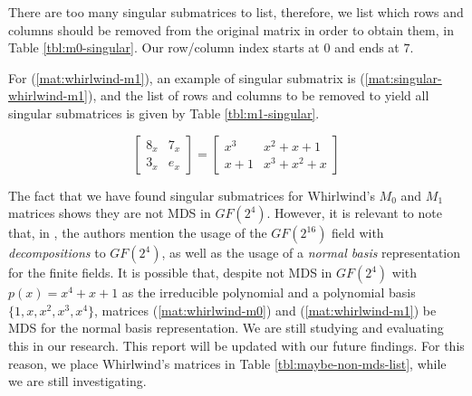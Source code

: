 There are too many singular submatrices to list, therefore, we list which rows and columns should be removed from the original matrix in order to obtain them, in Table \ref{tbl:m0-singular}. Our row/column index starts at $0$ and ends at $7$.



For (\ref{mat:whirlwind-m1}), an example of singular submatrix is (\ref{mat:singular-whirlwind-m1}), and the list of rows and columns to be removed to yield all singular submatrices is given by Table \ref{tbl:m1-singular}.

\begin{equation}\label{mat:singular-whirlwind-m1}
\begin{bmatrix}
8_x & 7_x\\
3_x & e_x
\end{bmatrix}
=
\begin{bmatrix}
x^3 & x^2 + x + 1\\
x + 1 & x^3 + x^2 + x
\end{bmatrix}
\end{equation}



The fact that we have found singular submatrices for Whirlwind's $M_0$ and $M_1$ matrices shows they are not MDS in $GF(2^4)$. However, it is relevant to note that, in \cite{Whirlwind2010}, the authors mention the usage of the $GF(2^{16})$ field with \emph{decompositions} to $GF(2^4)$, as well as the usage of a \emph{normal basis} representation for the finite fields. It is possible that, despite not MDS in $GF(2^4)$ with $p(x) = x^4+x+1$ as the irreducible polynomial and a polynomial basis $\{1, x, x^2, x^3, x^4\}$, matrices (\ref{mat:whirlwind-m0}) and (\ref{mat:whirlwind-m1}) be MDS for the normal basis representation. We are still studying and evaluating this in our research. This report will be updated with our future findings. For this reason, we place Whirlwind's matrices in Table \ref{tbl:maybe-non-mds-list}, while we are still investigating.


